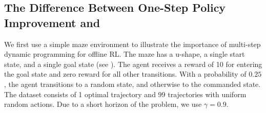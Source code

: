 \vspace{-0.2cm}
\subsection{The Difference Between One-Step Policy Improvement and \ourname}
\label{sec:example}
\vspace{-0.2cm}


We first use a simple maze environment to illustrate the importance of multi-step dynamic programming for offline RL.
The maze has a u-shape, a single start state, and a single goal state (see ).
The agent receives a reward of 10 for entering the goal state and zero reward for all other transitions. With a probability of $0.25$, the agent transitions to a random state, and otherwise to the commanded state.
The dataset consists of 1 optimal trajectory and 99 trajectories with uniform random actions.
Due to a short horizon of the problem, we use $\gamma=0.9$.


